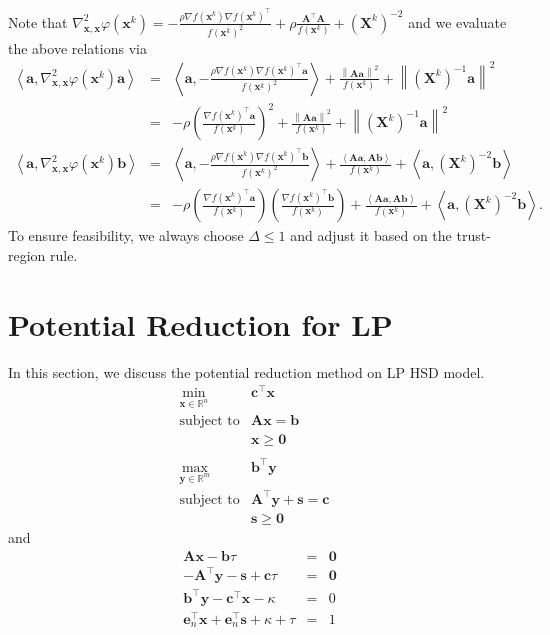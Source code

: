 \documentclass{article}
\newcommand{\x}{\mathbf{x}}
\newcommand{\A}{\mathbf{A}}
\newcommand{\0}{\textbf{0}}
\newcommand{\e}{\mathbf{e}}
\newcommand{\n}{\nabla}
\newcommand{\X}{\mathbf{X}}
\newcommand{\tma}{\mathbf{a}}
\newcommand{\tmb}{\mathbf{b}}
\newcommand{\tmc}{\mathbf{c}}
\newcommand{\y}{\mathbf{y}}
\newcommand{\s}{\mathbf{s}}
\begin{document}
Note that $\nabla^2_{\x, \x} \varphi \left( \x^k \right) = - \frac{\rho \n f
\left( \x^k \right) \n f \left( \x^k \right)^{\top}}{f \left( \x^k \right)^2}
+ \rho \frac{\A^{\top} \A}{f \left( \x^k \right)} + \left( \X^k \right)^{- 2}$
and we evaluate the above relations via
\begin{eqnarray*}
  \left\langle \tma, \nabla^2_{\x, \x} \varphi \left( \x^k \right) \tma
  \right\rangle & = & \left\langle \tma, - \frac{\rho \n f \left( \x^k \right)
  \n f \left( \x^k \right)^{\top} \tma}{f \left( \x^k \right)^2} \right\rangle
  + \frac{\left\| \A \tma \right\|^2}{f \left( \x^k \right)} + \left\| \left(
  \X^k \right)^{- 1} \tma \right\|^2\\
  & = & - \rho \left( \frac{\n f \left( \x^k \right)^{\top} \tma}{f \left(
  \x^k \right)} \right)^2 + \frac{\left\| \A \tma \right\|^2}{f \left( \x^k
  \right)} + \left\| \left( \X^k \right)^{- 1} \tma \right\|^2\\
  \left\langle \tma, \nabla^2_{\x, \x} \varphi \left( \x^k \right) \tmb
  \right\rangle & = & \left\langle \tma, - \frac{\rho \n f \left( \x^k \right)
  \n f \left( \x^k \right)^{\top} \tmb}{f \left( \x^k \right)^2} \right\rangle
  + \frac{\left\langle \A \tma, \A \tmb \right\rangle}{f \left( \x^k \right)}
  + \left\langle \tma, \left( \X^k \right)^{- 2} \tmb \right\rangle\\
  & = & - \rho \left( \frac{\n f \left( \x^k \right)^{\top} \tma}{f \left(
  \x^k \right)} \right) \left( \frac{\n f \left( \x^k \right)^{\top} \tmb}{f
  \left( \x^k \right)} \right) + \frac{\left\langle \A \tma, \A \tmb
  \right\rangle}{f \left( \x^k \right)} + \left\langle \tma, \left( \X^k
  \right)^{- 2} \tmb \right\rangle .
\end{eqnarray*}
To ensure feasibility, we always choose $\Delta \leq 1$ and adjust it based on
the trust-region rule.

\section{Potential Reduction for LP}

In this section, we discuss the potential reduction method on LP HSD model.
\begin{eqnarray*}
  \min_{\x \in \mathbb{R}^n} & \tmc^{\top} \x & \\
  \text{subject to} & \A \x = \tmb & \\
  & \x \geq \0 & \\
  &  & \\
  \max_{\y \in \mathbb{R}^m} & \tmb^{\top} \y & \\
  \text{subject to} & \A^{\top} \y + \s = \tmc & \\
  & \s \geq \0 & 
\end{eqnarray*}
and
\begin{eqnarray*}
  \A \x - \tmb \tau & = & \0\\
  - \A^{\top} \y - \s + \tmc \tau & = & \0\\
  \tmb^{\top} \y - \tmc^{\top} \x - \kappa & = & 0\\
  \e_n^{\top} \x + \e_n^{\top} \s + \kappa + \tau & = & 1
\end{eqnarray*}
\end{document}
